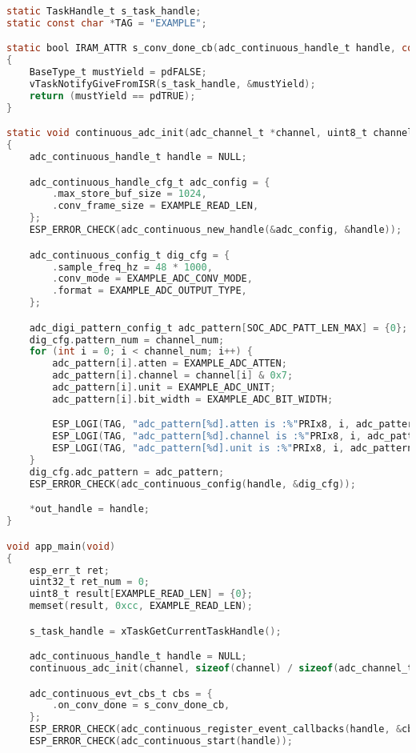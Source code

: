 \documentclass[11pt]{article}
\begin{document}
\begin{lstlisting}[language=C, caption={ESP32 Firmware (ADC continuous, two channels)}]
static TaskHandle_t s_task_handle;
static const char *TAG = "EXAMPLE";

static bool IRAM_ATTR s_conv_done_cb(adc_continuous_handle_t handle, const adc_continuous_evt_data_t *edata, void *user_data)
{
    BaseType_t mustYield = pdFALSE;
    vTaskNotifyGiveFromISR(s_task_handle, &mustYield);
    return (mustYield == pdTRUE);
}

static void continuous_adc_init(adc_channel_t *channel, uint8_t channel_num, adc_continuous_handle_t *out_handle)
{
    adc_continuous_handle_t handle = NULL;

    adc_continuous_handle_cfg_t adc_config = {
        .max_store_buf_size = 1024,
        .conv_frame_size = EXAMPLE_READ_LEN,
    };
    ESP_ERROR_CHECK(adc_continuous_new_handle(&adc_config, &handle));

    adc_continuous_config_t dig_cfg = {
        .sample_freq_hz = 48 * 1000,
        .conv_mode = EXAMPLE_ADC_CONV_MODE,
        .format = EXAMPLE_ADC_OUTPUT_TYPE,
    };

    adc_digi_pattern_config_t adc_pattern[SOC_ADC_PATT_LEN_MAX] = {0};
    dig_cfg.pattern_num = channel_num;
    for (int i = 0; i < channel_num; i++) {
        adc_pattern[i].atten = EXAMPLE_ADC_ATTEN;
        adc_pattern[i].channel = channel[i] & 0x7;
        adc_pattern[i].unit = EXAMPLE_ADC_UNIT;
        adc_pattern[i].bit_width = EXAMPLE_ADC_BIT_WIDTH;

        ESP_LOGI(TAG, "adc_pattern[%d].atten is :%"PRIx8, i, adc_pattern[i].atten);
        ESP_LOGI(TAG, "adc_pattern[%d].channel is :%"PRIx8, i, adc_pattern[i].channel);
        ESP_LOGI(TAG, "adc_pattern[%d].unit is :%"PRIx8, i, adc_pattern[i].unit);
    }
    dig_cfg.adc_pattern = adc_pattern;
    ESP_ERROR_CHECK(adc_continuous_config(handle, &dig_cfg));

    *out_handle = handle;
}

void app_main(void)
{
    esp_err_t ret;
    uint32_t ret_num = 0;
    uint8_t result[EXAMPLE_READ_LEN] = {0};
    memset(result, 0xcc, EXAMPLE_READ_LEN);

    s_task_handle = xTaskGetCurrentTaskHandle();

    adc_continuous_handle_t handle = NULL;
    continuous_adc_init(channel, sizeof(channel) / sizeof(adc_channel_t), &handle);

    adc_continuous_evt_cbs_t cbs = {
        .on_conv_done = s_conv_done_cb,
    };
    ESP_ERROR_CHECK(adc_continuous_register_event_callbacks(handle, &cbs, NULL));
    ESP_ERROR_CHECK(adc_continuous_start(handle));


\end{lstlisting}
\end{document}
